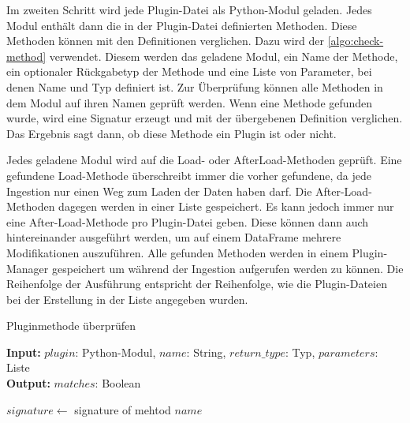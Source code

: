Im zweiten Schritt wird jede Plugin-Datei als Python-Modul geladen.
Jedes Modul enthält dann die in der Plugin-Datei definierten Methoden.
Diese Methoden können mit den Definitionen verglichen.
Dazu wird der \cref{algo:check-method} verwendet.
Diesem werden das geladene Modul, ein Name der Methode, ein optionaler Rückgabetyp der Methode und eine Liste von Parameter, bei denen Name und Typ definiert ist.
Zur Überprüfung können alle Methoden in dem Modul auf ihren Namen geprüft werden.
Wenn eine Methode gefunden wurde, wird eine Signatur erzeugt und mit der übergebenen Definition verglichen.
Das Ergebnis sagt dann, ob diese Methode ein Plugin ist oder nicht.

Jedes geladene Modul wird auf die Load- oder AfterLoad-Methoden geprüft.
Eine gefundene Load-Methode überschreibt immer die vorher gefundene, da jede Ingestion nur einen Weg zum Laden der Daten haben darf.
Die After-Load-Methoden dagegen werden in einer Liste gespeichert.
Es kann jedoch immer nur eine After-Load-Methode pro Plugin-Datei geben.
Diese können dann auch hintereinander ausgeführt werden, um auf einem DataFrame mehrere Modifikationen auszuführen.
Alle gefunden Methoden werden in einem Plugin-Manager gespeichert um während der Ingestion aufgerufen werden zu können.
Die Reihenfolge der Ausführung entspricht der Reihenfolge, wie die Plugin-Dateien bei der Erstellung in der Liste angegeben wurden.

\begin{algorithm}
    \caption{Pluginmethode überprüfen}
    \label{algo:check-method}

    \textbf{Input:} $plugin$: Python-Modul, $name$: String, $return\_type$: Typ, $parameters$: Liste \\
    \textbf{Output:} $matches$: Boolean \\


    $signature \gets$ signature of mehtod $name$




\end{algorithm}

